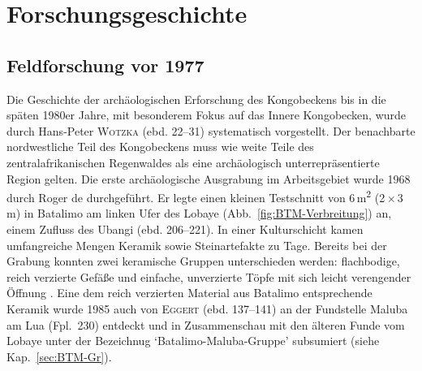 
\section{Forschungsgeschichte}

\subsection*{Feldforschung vor 1977}

Die Geschichte der archäologischen Erforschung des Kongobeckens bis in die späten 1980er Jahre, mit besonderem Fokus auf das Innere Kongobecken, wurde durch Hans-Peter \textsc{Wotzka} (ebd. 22--31) systematisch vorgestellt. Der benachbarte nordwestliche Teil des Kongobeckens muss wie weite Teile des zentralafrikanischen Regenwaldes als eine archäologisch unterrepräsentierte Region gelten. Die erste archäologische Ausgrabung im Arbeitsgebiet wurde 1968 durch Roger de \textcite{deBayledesHermens.1975} durchgeführt. Er legte einen kleinen Testschnitt von 6\,m\textsuperscript{2} (2\,\( \times \)\,3\,m) in Batalimo am linken Ufer des Lobaye (Abb.~\ref{fig:BTM-Verbreitung}) an, einem Zufluss des Ubangi (ebd. 206--221). In einer Kulturschicht kamen umfangreiche Mengen Keramik sowie Steinartefakte zu Tage. Bereits bei der Grabung konnten zwei keramische Gruppen unterschieden werden: flachbodige, reich verzierte Gefäße und einfache, unverzierte Töpfe mit sich leicht verengender Öffnung \parencites[224ff., 234]{Aumassip.1975}[134]{Eggert.1987c}. Eine dem reich verzierten Material aus Batalimo entsprechende Keramik wurde 1985 auch von \textsc{Eggert} (ebd. 137--141) an der Fundstelle Maluba am Lua (Fpl.~230) entdeckt und in Zusammenschau mit den älteren Funde vom Lobaye unter der Bezeichnug \enquote*{Batalimo-Maluba-Gruppe} subsumiert (siehe Kap.~\ref{sec:BTM-Gr}).

